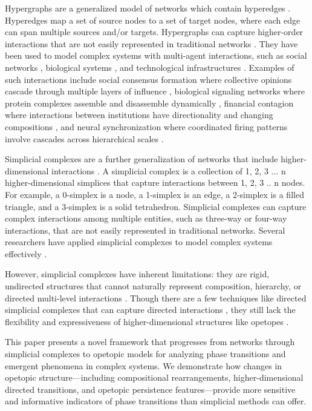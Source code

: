 Hypergraphs are a generalized model of networks which contain hyperedges \citep{berge1984hypergraphs, battiston2020networks}. Hyperedges map a set of source nodes to a set of target nodes, where each edge can span multiple sources and/or targets. Hypergraphs can capture higher-order interactions that are not easily represented in traditional networks \citep{benson2016higher}. They have been used to model complex systems with multi-agent interactions, such as social networks \citep{zhou2007learning}, biological systems \citep{klamt2009hypergraphs}, and technological infrastructures \citep{xu2013hypernetwork}. Examples of such interactions include social consensus formation where collective opinions cascade through multiple layers of influence \citep{neuhäuser2021consensus}, biological signaling networks where protein complexes assemble and disassemble dynamically \citep{ramadan2020hypergraph}, financial contagion where interactions between institutions have directionality and changing compositions \citep{hüser2020financial}, and neural synchronization where coordinated firing patterns involve cascades across hierarchical scales \citep{petri2014homological, giusti2016two, sizemore2018importance}.

Simplicial complexes are a further generalization of networks that include higher-dimensional interactions \citep{petri2014homological, giusti2016two, sizemore2018importance}. A simplicial complex is a collection of 1, 2, 3 ... n higher-dimensional simplices that capture interactions between 1, 2, 3 .. n nodes. For example, a 0-simplex is a node, a 1-simplex is an edge, a 2-simplex is a filled triangle, and a 3-simplex is a solid tetrahedron.  Simplicial complexes can capture complex interactions among multiple entities, such as three-way or four-way interactions, that are not easily represented in traditional networks. Several researchers have applied simplicial complexes to model complex systems effectively \citep{petri2014homological, giusti2016two, sizemore2018importance}.

However, simplicial complexes have inherent limitations: they are rigid, undirected structures that cannot naturally represent composition, hierarchy, or directed multi-level interactions \citep{gong2024higher}. Though there are a few techniques like directed simplicial complexes that can capture directed interactions \citep{masulli2016topology, mukherjee2016random, levi2014directed}, they still lack the flexibility and expressiveness of higher-dimensional structures like opetopes \citep{baez1997higher, cheng2004higher, spivak2013opetopes}.

This paper presents a novel framework that progresses from networks through simplicial complexes to opetopic models for analyzing phase transitions and emergent phenomena in complex systems. We demonstrate how changes in opetopic structure—including compositional rearrangements, higher-dimensional directed transitions, and opetopic persistence features—provide more sensitive and informative indicators of phase transitions than simplicial methods can offer.
